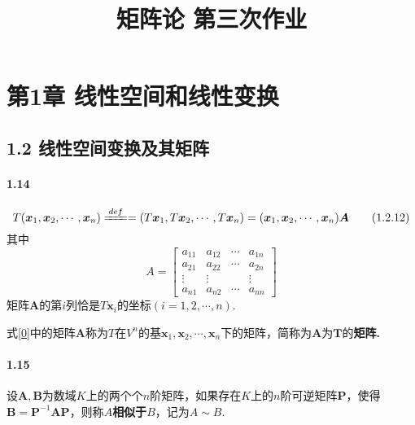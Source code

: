 \documentclass[12pt, a4paper, oneside, fontset=none]{ctexart}
\author{}
\date{}
\title{\vspace{-3em}\textbf{矩阵论 \quad 第三次作业}\vspace{-3em}}
\begin{document}
\maketitle

\section*{第1章 \quad 线性空间和线性变换}

\subsection*{1.2 \quad 线性空间变换及其矩阵}

{}

\paragraph*{1.14}
\begin{equation*}
    T(\bm{x}_1,\bm{x}_2,\cdots,\bm{x}_n) \xlongequal{def} = (T\bm{x}_1,T\bm{x}_2,\cdots,T\bm{x}_n) = (\bm{x}_1,\bm{x}_2,\cdots,\bm{x}_n) \bm{A} \tag{1.2.12} \label{0}
\end{equation*}
其中
\[
    A = \begin{bmatrix}
        a_{11} & a_{12} & \cdots & a_{1n} \\
        a_{21} & a_{22} & \cdots & a_{2n} \\
        \vdots & \vdots &        & \vdots \\
        a_{n1} & a_{n2} & \cdots & a_{nn}
    \end{bmatrix}
\]
矩阵$\bm{A}$的第$i$列恰是$T\bm{x}_i$的坐标$(i = 1, 2, \cdots, n)$.

式\eqref{0}中的矩阵$\bm{A}$称为$T$在$V^n$的基$\bm{x}_1,\bm{x}_2,\cdots,\bm{x}_n$下的矩阵，简称为$\bm{A}$为$\bm{T}$的\textbf{矩阵.}

\paragraph*{1.15} 设$\bm{A},\bm{B}$为数域$K$上的两个个$n$阶矩阵，如果存在$K$上的$n$阶可逆矩阵$\bm{P}$，使得
$\bm{B} = \bm{P}^{-1} \bm{AP}$，则称\textbf{$A$相似于$B$}，记为$A \sim B.$

{}
\end{document}
